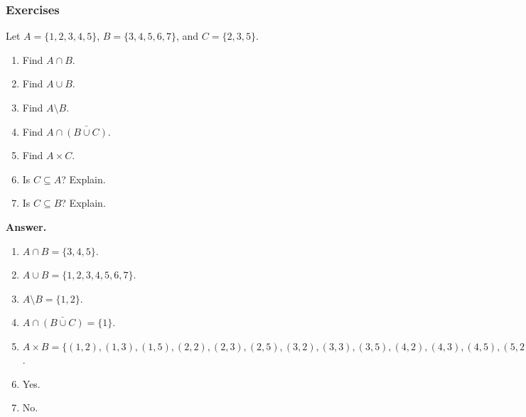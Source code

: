 \documentclass[10pt,]{book}
\theoremstyle{plain}
\theoremstyle{definition}
\theoremstyle{definition}
\theoremstyle{definition}
\numberwithin{equation}{section}
\begin{document}
\subsubsection[Exercises]{Exercises}\label{exercises-1}
\begin{exerciselist}
\item[1.]\hypertarget{exercise-1}{}
            Let \(A = \{1,2,3,4,5\}\), \(B = \{3,4,5,6,7\}\), and \(C = \{2,3,5\}\).
\leavevmode%
\begin{enumerate}[label=(\alph*)]
\item\hypertarget{li-66}{}
                Find \(A \cap B\).
\item\hypertarget{li-67}{}
                Find \(A \cup B\).
\item\hypertarget{li-68}{}
                Find \(A \setminus B\).
\item\hypertarget{li-69}{}
                Find \(A \cap \bar{(B \cup C)}\).
\item\hypertarget{li-70}{}
                Find \(A \times C\).
\item\hypertarget{li-71}{}
                Is \(C \subseteq A\)? Explain.
\item\hypertarget{li-72}{}
                Is \(C \subseteq B\)? Explain.
\end{enumerate}
\par\smallskip
\par\smallskip
\noindent\textbf{Answer.}\hypertarget{answer-1}{}\quad
\leavevmode%
\begin{enumerate}[label=(\alph*)]
\item\hypertarget{li-73}{}\(A \cap B = \{3,4,5\}\).\item\hypertarget{li-74}{}\(A \cup B = \{1,2,3,4,5,6,7\}\).\item\hypertarget{li-75}{}\(A \setminus B = \{1,2\}\).\item\hypertarget{li-76}{}\(A \cap \bar{(B \cup C)} = \{1\}\).\item\hypertarget{li-77}{}\(A \times B = \{(1,2), (1,3), (1,5), (2,2), (2,3), (2,5), (3,2), (3,3), (3,5), (4,2), (4,3), (4,5), (5,2), (5,3), (5,5)\}\).\item\hypertarget{li-78}{}
                Yes.
\item\hypertarget{li-79}{}
                No.
\end{enumerate}
\item[2.]\hypertarget{exercise-2}{}

\end{exerciselist}
\end{document}
